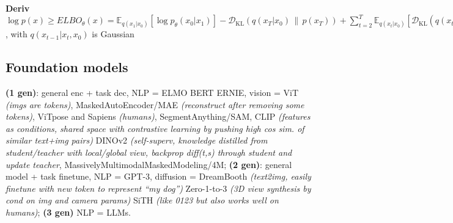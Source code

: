 \textbf{Deriv} $\log p(x) \geq ELBO_\theta(x) =
\mathbb{E}_{q(x_1|x_0)} [\allowbreak \log p_\theta(x_0 | x_1)]
- \mathcal{D}_{\text{KL}}(\allowbreak q(x_T | x_0) \,\|\, p(x_T))
+ \sum_{t=2}^{T} \allowbreak \mathbb{E}_{q(x_t | x_0)} \left[\allowbreak
\mathcal{D}_{\text{KL}}\left(q(x_{t-1} | x_t, x_0) \,\|\, p_\theta(x_{t-1} | x_t) \right) \right]$, with $q(x_{t-1}|x_t,x_0)$ is Gaussian

\subsection*{Foundation models}

\textbf{(1 gen)}: general enc + task dec, NLP = ELMO BERT ERNIE, vision = ViT \textit{(imgs are tokens)}, MaskedAutoEncoder/MAE \textit{(reconstruct after removing some tokens)}, ViTpose and Sapiens \textit{(humans)}, SegmentAnything/SAM, CLIP \textit{(features as conditions, shared space with contrastive learning by pushing high cos sim. of similar text+img pairs)} DINOv2 \textit{(self-superv, knowledge distilled from student/teacher with local/global view, backprop diff(t,s) through student and update teacher}, MassivelyMultimodalMaskedModeling/4M; \textbf{(2 gen)}: general model + task finetune, NLP = GPT-3, diffusion = DreamBooth \textit{(text2img, easily finetune with new token to represent ``my dog'')} Zero-1-to-3 \textit{(3D view synthesis by cond on img and camera params)} SiTH \textit{(like 0123 but also works well on humans)}; \textbf{(3 gen)} NLP = LLMs.
